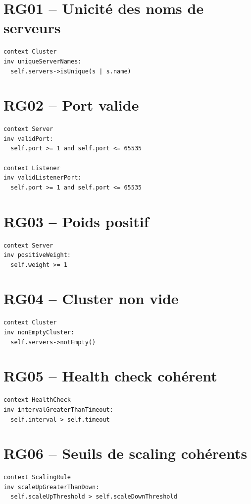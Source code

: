 \documentclass[12pt,a4paper]{report}
\begin{document}
\section{RG01 -- Unicité des noms de serveurs}
\begin{lstlisting}[language=OCL]
context Cluster
inv uniqueServerNames:
  self.servers->isUnique(s | s.name)
\end{lstlisting}

\section{RG02 -- Port valide}
\begin{lstlisting}[language=OCL]
context Server
inv validPort:
  self.port >= 1 and self.port <= 65535

context Listener
inv validListenerPort:
  self.port >= 1 and self.port <= 65535
\end{lstlisting}

\section{RG03 -- Poids positif}
\begin{lstlisting}[language=OCL]
context Server
inv positiveWeight:
  self.weight >= 1
\end{lstlisting}

\section{RG04 -- Cluster non vide}
\begin{lstlisting}[language=OCL]
context Cluster
inv nonEmptyCluster:
  self.servers->notEmpty()
\end{lstlisting}

\section{RG05 -- Health check cohérent}
\begin{lstlisting}[language=OCL]
context HealthCheck
inv intervalGreaterThanTimeout:
  self.interval > self.timeout
\end{lstlisting}

\section{RG06 -- Seuils de scaling cohérents}
\begin{lstlisting}[language=OCL]
context ScalingRule
inv scaleUpGreaterThanDown:
  self.scaleUpThreshold > self.scaleDownThreshold
\end{lstlisting}
\end{document}
